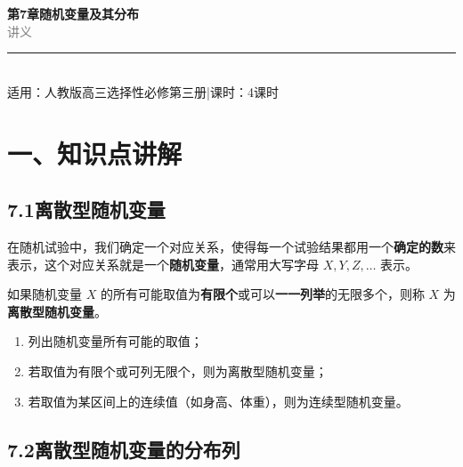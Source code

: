 \documentclass[12pt, a4paper]{ctexart}
\begin{document}
\begin{center}
{\Huge\bfseries\textcolor{mainblue}{第7章\quad 随机变量及其分布}}\\[12pt]
{\Large\textcolor{gray}{讲\quad 义}}\\[8pt]
\rule{0.6\textwidth}{1pt}\\[8pt]
{\normalsize 适用：人教版\quad 高三选择性必修第三册\quad |\quad 课时：4课时}
\end{center}
\vspace{10pt}

\section*{\textcolor{mainblue}{一、知识点讲解}}

\subsection*{7.1\quad 离散型随机变量}

\begin{knowledgebox}[离散型随机变量的定义]
在随机试验中，我们确定一个对应关系，使得每一个试验结果都用一个\textbf{确定的数}来表示，这个对应关系就是一个\textbf{随机变量}，通常用大写字母 $X, Y, Z, \ldots$ 表示。

如果随机变量 $X$ 的所有可能取值为\textbf{有限个}或可以\textbf{一一列举}的无限多个，则称 $X$ 为\textbf{离散型随机变量}。
\end{knowledgebox}

\begin{tipbox}[判断随机变量是否离散的方法]
\begin{enumerate}[label=(\arabic*)]
  \item 列出随机变量所有可能的取值；
  \item 若取值为有限个或可列无限个，则为离散型随机变量；
  \item 若取值为某区间上的连续值（如身高、体重），则为连续型随机变量。
\end{enumerate}
\end{tipbox}

\subsection*{7.2\quad 离散型随机变量的分布列}
\end{document}
